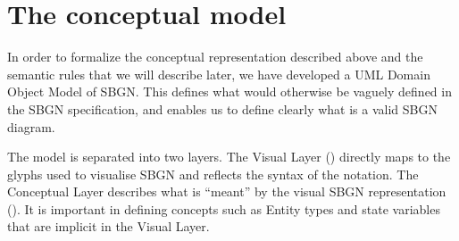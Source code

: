 \section{The conceptual model}

In order to formalize the conceptual representation described above
and the semantic rules that we will describe later, we have developed a UML
Domain Object Model of SBGN\@. This defines what would otherwise be
vaguely defined in the SBGN specification, and enables us to define
clearly what is a valid SBGN diagram.

The model is separated into two layers. The Visual Layer
() directly maps to the glyphs used to
visualise SBGN and reflects the syntax of the notation. The Conceptual
Layer describes what is ``meant'' by the visual SBGN representation
(). It is important in defining
concepts such as Entity types and state variables that are implicit in the Visual Layer.

